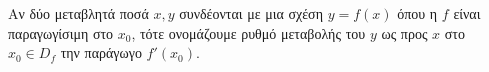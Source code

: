 Αν δύο μεταβλητά ποσά $ x,y $ συνδέονται με μια σχέση $ y=f(x) $ όπου η $ f $ είναι παραγωγίσιμη στο $ x_0 $, τότε ονομάζουμε ρυθμό μεταβολής του $ y $ ως προς $ x $ στο $ x_0\in D_f $ την παράγωγο $ f'(x_0) $.
